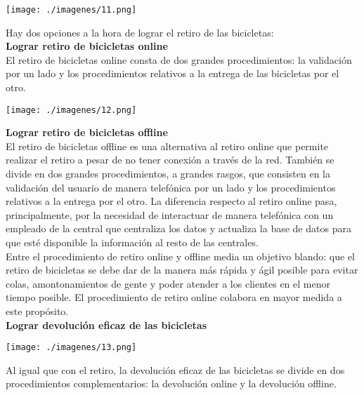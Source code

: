\documentclass[a4paper, 11pt, spanish]{article}
\begin{document}
\vspace*{0.7cm}
\centerline{\texttt{[image: ./imagenes/11.png]}}
\vspace*{0.7cm}

Hay dos opciones a la hora de lograr el retiro de las bicicletas:\\

\textbf{Lograr retiro de bicicletas online}\\

El retiro de bicicletas online consta de dos grandes procedimientos: la validación por un lado y los procedimientos relativos a la entrega de las bicicletas por el otro.\\

\vspace*{0.7cm}
\centerline{\texttt{[image: ./imagenes/12.png]}}
\vspace*{0.7cm}

\textbf{Lograr retiro de bicicletas offline}\\

El retiro de bicicletas offline es una alternativa al retiro online que permite realizar el retiro a pesar de no tener conexión a través de la red. También se divide en dos grandes procedimientos, a grandes rasgos, que consisten en la validación del usuario de manera telefónica por un lado y los procedimientos relativos a la entrega por el otro. La diferencia respecto al retiro online pasa, principalmente, por la necesidad de interactuar de manera telefónica con un empleado de la central que centraliza los datos y actualiza la base de datos para que esté disponible la información al resto de las centrales.\\

Entre el procedimiento de retiro online y offline media un objetivo blando: que el retiro de bicicletas se debe dar de la manera más rápida y ágil posible para evitar colas, amontonamientos de gente y poder atender a los clientes en el menor tiempo posible. El procedimiento de retiro online colabora en mayor medida a este propósito.\\


\textbf{Lograr devolución eficaz de las bicicletas}\\

\vspace*{0.7cm}
\centerline{\texttt{[image: ./imagenes/13.png]}}
\vspace*{0.7cm}


Al igual que con el retiro, la devolución eficaz de las bicicletas se divide en dos procedimientos complementarios: la devolución online y la devolución offline.
\end{document}
